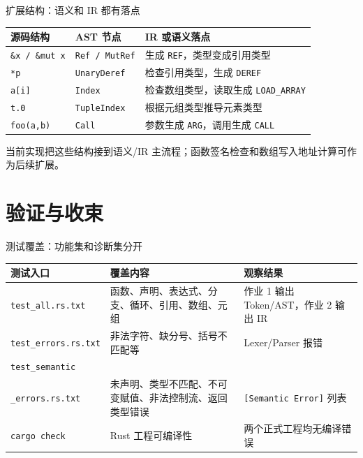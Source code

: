 \documentclass[aspectratio=169]{ctexbeamer}
\begin{document}
\begin{frame}{扩展结构：语义和 IR 都有落点}
    \begin{table}
    \centering
    \small
    \begin{tabular}{p{2.8cm}p{4.0cm}p{4.6cm}}
        \toprule
        \textbf{源码结构} & \textbf{AST 节点} & \textbf{IR 或语义落点} \\
        \midrule
        \texttt{\&x / \&mut x} & \texttt{Ref / MutRef} & 生成 \texttt{REF}，类型变成引用类型 \\
        \texttt{*p} & \texttt{UnaryDeref} & 检查引用类型，生成 \texttt{DEREF} \\
        \texttt{a[i]} & \texttt{Index} & 检查数组类型，读取生成 \texttt{LOAD\_ARRAY} \\
        \texttt{t.0} & \texttt{TupleIndex} & 根据元组类型推导元素类型 \\
        \texttt{foo(a,b)} & \texttt{Call} & 参数生成 \texttt{ARG}，调用生成 \texttt{CALL} \\
        \bottomrule
    \end{tabular}
    \end{table}
    \vspace{0.2em}
    \small
    当前实现把这些结构接到语义/IR 主流程；函数签名检查和数组写入地址计算可作为后续扩展。
\end{frame}

\section{验证与收束}

\begin{frame}{测试覆盖：功能集和诊断集分开}
    \begin{table}
    \centering
    \scriptsize
    \begin{tabular}{p{2.7cm}p{4.1cm}p{4.7cm}}
        \toprule
        \textbf{测试入口} & \textbf{覆盖内容} & \textbf{观察结果} \\
        \midrule
        \texttt{test\_all.rs.txt} & 函数、声明、表达式、分支、循环、引用、数组、元组 & 作业 1 输出 Token/AST，作业 2 输出 IR \\
        \texttt{test\_errors.rs.txt} & 非法字符、缺分号、括号不匹配等 & Lexer/Parser 报错 \\
        \texttt{test\_semantic}\\\texttt{\_errors.rs.txt} & 未声明、类型不匹配、不可变赋值、非法控制流、返回类型错误 & \texttt{[Semantic Error]} 列表 \\
        \texttt{cargo check} & Rust 工程可编译性 & 两个正式工程均无编译错误 \\
        \bottomrule
    \end{tabular}
    \end{table}
\end{frame}
\end{document}
